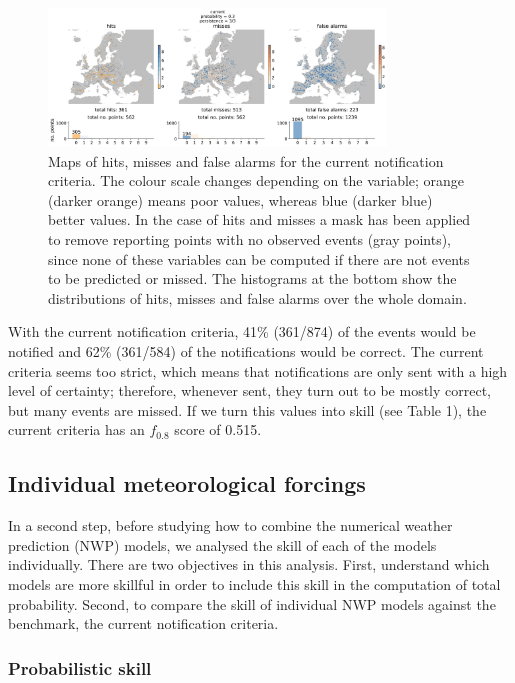 \documentclass[preprint,12pt]{elsarticle}
\begin{document}
\begin{figure}
    \centering
    \includegraphics[width=0.8\textwidth]{figures/hits_maps_reporting_points_2000km2_1239points_current_060h.jpg}
    \caption{Maps of hits, misses and false alarms for the current notification criteria. The colour scale changes depending on the variable; orange (darker orange) means poor values, whereas blue (darker blue) better values. In the case of hits and misses a mask has been applied to remove reporting points with no observed events (gray points), since none of these variables can be computed if there are not events to be predicted or missed. The histograms at the bottom show the distributions of hits, misses and false alarms over the whole domain.}
    \label{fig:benchmark}
\end{figure}

With the current notification criteria,  41\% (361/874) of the events would be notified and 62\% (361/584) of the notifications would be correct. The current criteria seems too strict, which means that notifications are only sent with a high level of certainty; therefore, whenever sent, they turn out to be mostly correct, but many events are missed. If we turn this values into skill (see Table 1), the current criteria  has an $f_{0.8}$ score of 0.515.

\subsection{Individual meteorological forcings}

In a second step, before studying how to combine the numerical weather prediction (NWP) models, we analysed the skill of each of the models individually. There are two objectives in this analysis. First, understand which models are more skillful in order to include this skill in the computation of total probability. Second, to compare the skill  of individual NWP models against the benchmark, the current notification criteria.

\subsubsection{Probabilistic skill}
\end{document}
